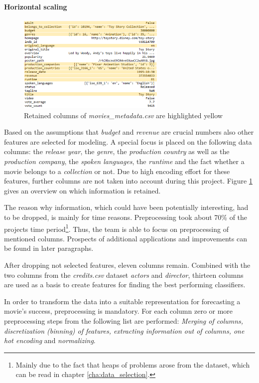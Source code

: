 \paragraph{Horizontal scaling}
\begin{figure}
	\includegraphics[width=0.63\textwidth]{images/3_metadata_columns.png}
	\caption{Retained columns of \textit{movies\_metadata.csv} are highlighted yellow}
	\label{img:mm_columns}
\end{figure}

Based on the assumptions that \textit{budget} and \textit{revenue} are crucial numbers also other features are selected for modeling. A special focus is placed on the following data columns: the \textit{release year}, the \textit{genre}, the \textit{production country} as well as the \textit{production company}, the \textit{spoken languages}, the \textit{runtime} and the fact whether a movie belongs to a \textit{collection} or not. Due to high encoding effort for these features, further columns are not taken into account during this project. Figure \ref{img:mm_columns} gives an overview on which information is retained.

The reason why information, which could have been potentially interesting, had to be dropped, is mainly for time reasons. Preprocessing took about 70\% of the projects time period\footnote{Mainly due to the fact that heaps of problems arose from the dataset, which can be read in chapter \ref{cha:data_selection}.}. Thus, the team is able to focus on preprocessing of mentioned columns. Prospects of additional applications and improvements can be found in later paragraphs.

After dropping not selected features, eleven columns remain. Combined with the two columns from the \textit{credits.csv} dataset \textit{actors} and \textit{director}, thirteen columns are used as a basis to create features for finding the best performing classifiers.

In order to transform the data into a suitable representation for forecasting a movie's success, preprocessing is mandatory. For each column zero or more preprocessing steps from the following list are performed: \textit{Merging of columns, discretization (binning) of features, extracting information out of columns, one hot encoding} and \textit{normalizing}.


